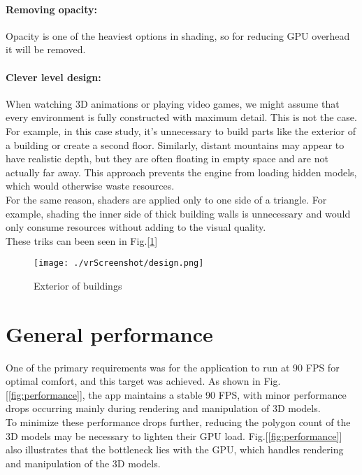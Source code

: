 \paragraph{Removing opacity:}
Opacity is one of the heaviest options in shading, so for reducing GPU overhead it will be removed.

\paragraph{Clever level design:}
When watching 3D animations or playing video games, we might assume that every environment is fully constructed with maximum detail.
This is not the case. For example, in this case study, it's unnecessary to build parts like the exterior of a building or create a second floor.
Similarly, distant mountains may appear to have realistic depth, but they are often floating in empty space and are not actually far away.
This approach prevents the engine from loading hidden models, which would otherwise waste resources.\\
For the same reason, shaders are applied only to one side of a triangle.
For example, shading the inner side of thick building walls is unnecessary and would only consume resources without adding to the visual quality.\\
These triks can been seen in Fig.[\ref{fig:design}]



\begin{figure}[ht]
  \centering
  \texttt{[image: ./vrScreenshot/design.png]}
  \caption{Exterior of buildings}
  \label{fig:design}
\end{figure}

\section{General performance}
\noindent
One of the primary requirements was for the application to run at 90 \ac{FPS} for optimal comfort, and this target was achieved. As shown in Fig.[\ref{fig:performance}],
the app maintains a stable 90 \ac{FPS}, with minor performance drops occurring mainly during rendering and manipulation of 3D models.\\
To minimize these performance drops further, reducing the polygon count of the 3D models may be necessary to lighten their GPU load.
Fig.[\ref{fig:performance}] also illustrates that the bottleneck lies with the GPU, which handles rendering and manipulation of the 3D models.

